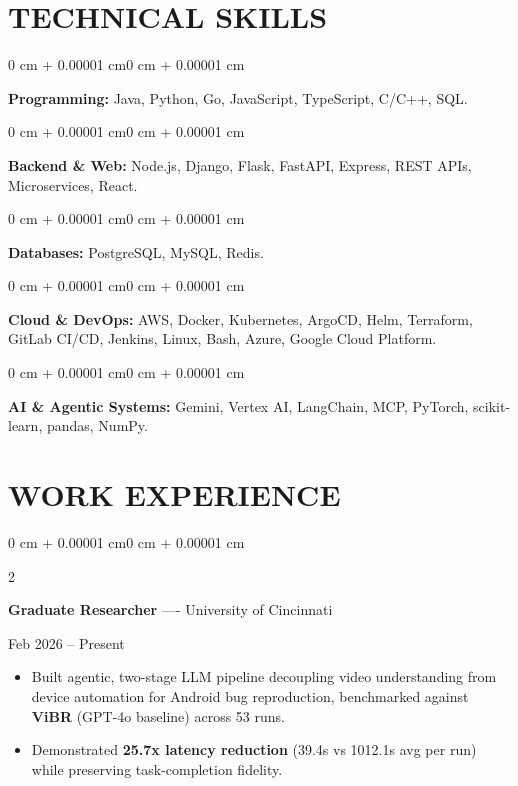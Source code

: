 \documentclass[10pt, letterpaper]{article}
\newenvironment{highlights}{
    \begin{itemize}[
        topsep=0.10 cm,
        parsep=0.06 cm,
        partopsep=0pt,
        itemsep=0.06 cm,
        leftmargin=12pt
    ]
}{
    \end{itemize}
}
\newenvironment{onecolentry}{
    \begin{adjustwidth}{0 cm + 0.00001 cm}{0 cm + 0.00001 cm}
}{
    \end{adjustwidth}
}
\newenvironment{twocolentry}[2][]{
    \onecolentry
    \def\secondColumn{#2}
    \setcolumnwidth{\fill, 4.5 cm}
    \begin{paracol}{2}
}{
    \switchcolumn \raggedleft \secondColumn
    \end{paracol}
    \endonecolentry
}
\begin{document}
\section{TECHNICAL SKILLS}
\begin{onecolentry}
\textbf{Programming:} Java, Python, Go, JavaScript, TypeScript, C/C++, SQL.
\end{onecolentry}
\vspace{0.06 cm}
\begin{onecolentry}
\textbf{Backend \& Web:} Node.js, Django, Flask, FastAPI, Express, REST APIs, Microservices, React.
\end{onecolentry}
\vspace{0.06 cm}
\begin{onecolentry}
\textbf{Databases:} PostgreSQL, MySQL, Redis.
\end{onecolentry}
\vspace{0.06 cm}
\begin{onecolentry}
\textbf{Cloud \& DevOps:} AWS, Docker, Kubernetes, ArgoCD, Helm, Terraform, GitLab CI/CD, Jenkins, Linux, Bash, Azure, Google Cloud Platform.
\end{onecolentry}
\vspace{0.06 cm}
\begin{onecolentry}
\textbf{AI \& Agentic Systems:} Gemini, Vertex AI, LangChain, MCP, PyTorch, scikit-learn, pandas, NumPy.
\end{onecolentry}

\section{WORK EXPERIENCE}
\begin{twocolentry}{Feb 2026 -- Present}
\textbf{Graduate Researcher} ---- University of Cincinnati
\end{twocolentry}
\begin{highlights}
  \item Built agentic, two-stage LLM pipeline decoupling video understanding from device automation for Android bug reproduction, benchmarked against \textbf{ViBR} (GPT-4o baseline) across 53 runs.
  \item Demonstrated \textbf{25.7x latency reduction} (39.4s vs 1012.1s avg per run) while preserving task-completion fidelity.
\end{highlights}

\vspace{0.15 cm}
\end{document}
